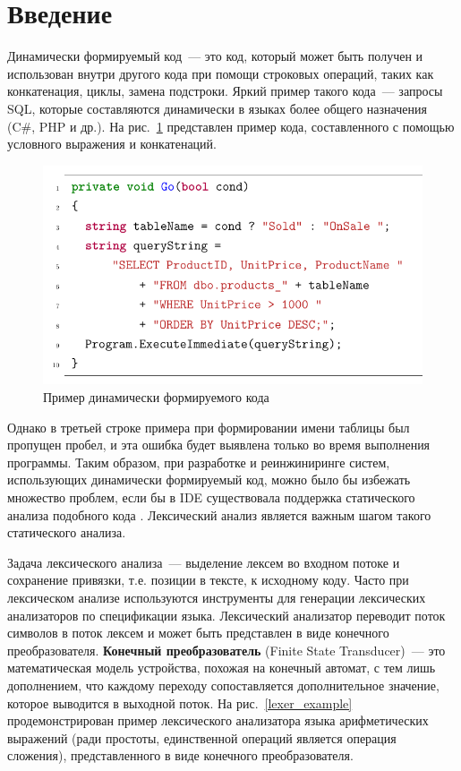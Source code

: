 
\section*{Введение}
Динамически формируемый код~--- это код, который может быть получен и использован внутри другого кода при помощи строковых операций, таких как конкатенация, циклы, замена подстроки. Яркий пример такого кода~--- запросы SQL, которые составляются динамически в языках более общего назначения (C\#, PHP и др.). На рис.~\ref{code_sample_1} представлен пример кода, составленного с помощью условного выражения и конкатенаций. 

\begin{figure}[h]
\centering
\includegraphics[width=\textwidth]{Baygeldin/pictures/intro_code.pdf}
\caption{Пример динамически формируемого кода}
\label{code_sample_1}
\end{figure}

Однако в третьей строке примера при формировании имени таблицы был пропущен пробел, и эта ошибка будет выявлена только во время выполнения программы. Таким образом, при разработке и реинжиниринге систем, использующих динамически формируемый код, можно было бы избежать множество проблем, если бы в IDE существовала поддержка статического анализа подобного кода \cite{string_embedded}. Лексический анализ является важным шагом такого статического анализа.

Задача лексического анализа~--- выделение лексем во входном потоке и сохранение привязки, т.е. позиции в тексте, к исходному коду. Часто при лексическом анализе используются инструменты для генерации лексических анализаторов по спецификации языка. Лексический анализатор переводит поток символов в поток лексем и может быть представлен в виде конечного преобразователя. \textbf{Конечный преобразователь} (Finite State Transducer)~--- это математическая модель устройства, похожая на конечный автомат, с тем лишь дополнением, что каждому переходу сопоставляется дополнительное значение, которое выводится в выходной поток. На рис.~\ref{lexer_example} продемонстрирован пример лексического анализатора языка арифметических выражений (ради простоты, единственной операций является операция сложения), представленного в виде конечного преобразователя.

